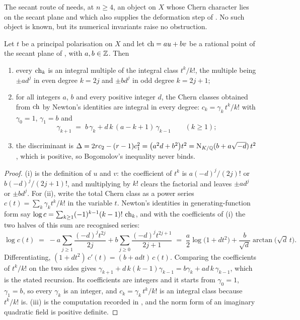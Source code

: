 The secant route of  needs, at $n\ge4$, an object on
$X$ whose Chern character lies on the secant plane and which also supplies the
deformation step of . No such object is known, but its
numerical invariants raise no obstruction.

\begin{proposition}%
\label{prop:notforbidden}
Let $t$ be a principal polarisation on $X$ and let
$\operatorname{ch}=au+bv$ be a rational point of the secant plane of ,
with $a,b\in\mathbb{Z}$. Then
\begin{enumerate}[label=\textup{(\roman*)},nosep]
\item every $\operatorname{ch}_{k}$ is an integral multiple of the integral class
  $t^{k}/k!$, the multiple being $\pm a d^{j}$ in even degree $k=2j$ and
  $\pm b d^{j}$ in odd degree $k=2j+1$;
\item for all integers $a$, $b$ and every positive integer $d$, the Chern
  classes obtained from $\operatorname{ch}$ by Newton's identities are integral in every
  degree: $c_{k}=\gamma_{k}\,t^{k}/k!$ with $\gamma_{0}=1$, $\gamma_{1}=b$ and
  \[
    \gamma_{k+1}\;=\;b\,\gamma_{k}+d\,k\,(a-k+1)\,\gamma_{k-1}\qquad(k\ge1);
  \]
\item the discriminant is
  $\Delta=2rc_{2}-(r-1)c_{1}^{2}=\bigl(a^{2}d+b^{2}\bigr)t^{2}
  =\mathrm{N}_{K/\mathbb{Q}}(b+a\sqrt{-d})\,t^{2}$, which is positive, so Bogomolov's
  inequality never binds.
\end{enumerate}
\end{proposition}

\begin{proof}
(i) is the definition of $u$ and $v$: the coefficient of $t^{k}$ is
$a(-d)^{j}/(2j)!$ or $b(-d)^{j}/(2j+1)!$, and multiplying by $k!$ clears the
factorial and leaves $\pm ad^{j}$ or $\pm bd^{j}$. For (ii), write the total
Chern class as a power series $c(t)=\sum_{k}\gamma_{k}t^{k}/k!$ in the
variable $t$. Newton's identities in generating-function form say
$\log c=\sum_{k\ge1}(-1)^{k-1}(k-1)!\,\operatorname{ch}_{k}$, and with the coefficients of
(i) the two halves of this sum are recognised series:
\[
  \log c(t)\;=\;-a\sum_{j\ge1}\frac{(-d)^{j}t^{2j}}{2j}
     +b\sum_{j\ge0}\frac{(-d)^{j}t^{2j+1}}{2j+1}
  \;=\;\frac{a}{2}\log\bigl(1+dt^{2}\bigr)
     +\frac{b}{\sqrt{d}}\arctan\bigl(\sqrt{d}\,t\bigr).
\]
Differentiating, $(1+dt^{2})\,c'(t)=(b+adt)\,c(t)$. Comparing the
coefficients of $t^{k}/k!$ on the two sides gives
$\gamma_{k+1}+d\,k(k-1)\gamma_{k-1}=b\gamma_{k}+ad\,k\,\gamma_{k-1}$, which is
the stated recursion. Its coefficients are integers and it starts from
$\gamma_{0}=1$, $\gamma_{1}=b$, so every $\gamma_{k}$ is an integer, and
$c_{k}=\gamma_{k}\,t^{k}/k!$ is an integral class because $t^{k}/k!$ is. (iii) is the computation recorded in
, and the norm form of an imaginary quadratic field
is positive definite.
\end{proof}

